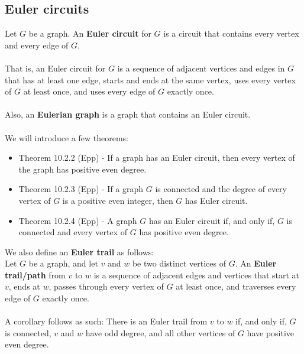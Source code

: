 \documentclass[a4paper]{article}
\begin{document}
\subsection{Euler circuits}
Let $G$ be a graph. An \textbf{Euler circuit} for $G$ is a circuit that contains every vertex and every edge of $G$.\\\\
That is, an Euler circuit for $G$ is a sequence of adjacent vertices and edges in $G$ that has at least one edge, starts and ends at the same vertex, uses every vertex of $G$ at least once, and uses every edge of $G$ exactly once.\\\\
Also, an \textbf{Eulerian graph} is a graph that contains an Euler circuit.\\\\
We will introduce a few theorems:
\begin{itemize}
	\item[] Theorem 10.2.2 (Epp) - If a graph has an Euler circuit, then every vertex of the graph has positive even degree.
	\item[] Theorem 10.2.3 (Epp) - If a graph $G$ is connected and the degree of every vertex of $G$ is a positive even integer, then $G$ has Euler circuit.
	\item[] Theorem 10.2.4 (Epp) - A graph $G$ has an Euler circuit if, and only if, $G$ is connected and every vertex of $G$ has positive even degree.
\end{itemize}
We also define an \textbf{Euler trail} as follows:\\
Let $G$ be a graph, and let $v$ and $w$ be two distinct vertices of $G$. An \textbf{Euler trail/path} from $v$ to $w$ is a sequence of adjacent edges and vertices that start at $v$, ends at $w$, passes through every vertex of $G$ at least once, and traverses every edge of $G$ exactly once.\\\\
A corollary follows as such: There is an Euler trail from $v$ to $w$ if, and only if, $G$ is connected, $v$ and $w$ have odd degree, and all other vertices of $G$ have positive even degree.
\end{document}
